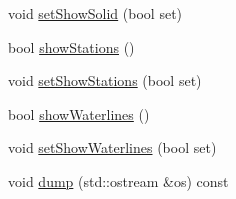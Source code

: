 \begin{DoxyCompactItemize}
\item 
void \hyperlink{classShipCAD_1_1DevelopedPatch_aba39dc6408881f90dc08c90779c7b1a6}{set\+Show\+Solid} (bool set)
\item 
bool \hyperlink{classShipCAD_1_1DevelopedPatch_a98e0c1b8c6302ce1beb475fb4590f483}{show\+Stations} ()
\item 
void \hyperlink{classShipCAD_1_1DevelopedPatch_a7780c1a8816517c8bccadc4a9fe64b29}{set\+Show\+Stations} (bool set)
\item 
bool \hyperlink{classShipCAD_1_1DevelopedPatch_adbab0c37bf68eff8e68c272051fa6a94}{show\+Waterlines} ()
\item 
void \hyperlink{classShipCAD_1_1DevelopedPatch_ac3daa557956f05c5ed4eb2da52706a85}{set\+Show\+Waterlines} (bool set)
\item 
void \hyperlink{classShipCAD_1_1DevelopedPatch_ae4f82982b3828b99f27c11ab20132516}{dump} (std\+::ostream \&os) const 
\end{DoxyCompactItemize}
